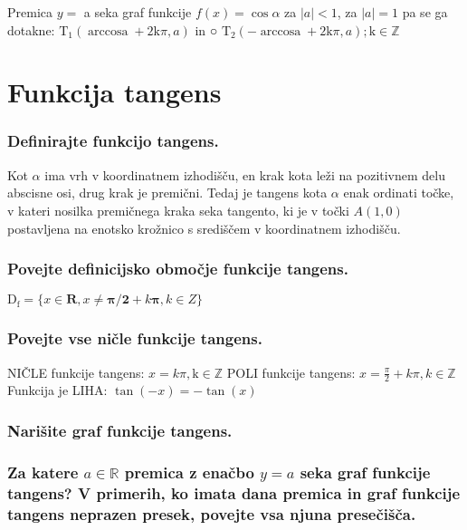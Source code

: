 \documentclass{article}
\begin{document}
Premica $y=$ a seka graf funkcije $f(x)=\cos \alpha$ za $|a|<1$, za $|a|=1$ pa se ga dotakne: $\mathrm{T}_{1}(\operatorname{arccosa}+2 \mathrm{k} \pi, a)$ in ○ $\mathrm{T}_{2}(-\operatorname{arccosa}+2 \mathrm{k} \pi, a) ; \mathrm{k} \in \mathbb{Z}$

\section{Funkcija tangens}
\subsubsection*{Definirajte funkcijo tangens.}

Kot $\alpha$ ima vrh v koordinatnem izhodišču, en krak kota leži na pozitivnem delu abscisne osi, drug krak je premični. Tedaj je tangens kota $\alpha$ enak ordinati točke, v kateri nosilka premičnega kraka seka tangento, ki je v točki $A(1,0)$ postavljena na enotsko krožnico s središčem v koordinatnem izhodišču.

\subsubsection*{Povejte definicijsko območje funkcije tangens.}

$\mathrm{D}_{\mathrm{f}}=\{x \in \boldsymbol{R}, x \neq \boldsymbol{\pi} / \mathbf{2}+k \boldsymbol{\pi}, k \in Z\}$

\subsubsection*{Povejte vse ničle funkcije tangens.}

NIČLE funkcije tangens: $x=k \pi, \mathrm{k} \in \mathbb{Z}$ POLI funkcije tangens: $x=\frac{\pi}{2}+k \pi, k \in \mathbb{Z}$ Funkcija je LIHA: $\tan (-x)=-\tan (x)$

\subsubsection*{Narišite graf funkcije tangens.}


\subsubsection*{Za katere $a \in \mathbb{R}$ premica z enačbo $y=a$ seka graf funkcije tangens? V primerih, ko imata dana premica in graf funkcije tangens neprazen presek, povejte vsa njuna presečišča.}
\end{document}
